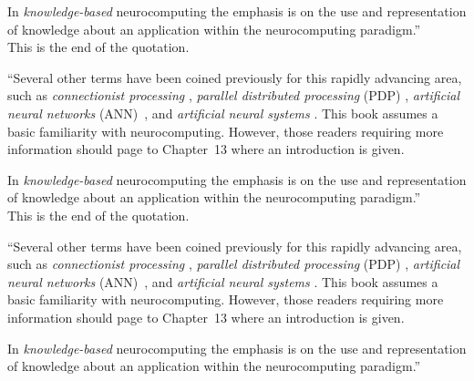 In \emph{knowledge-based}  neurocomputing the emphasis is on the use 
and representation of knowledge about an application within the 
neurocomputing paradigm.''\\

This is the end of the quotation.

``Several other terms have 
been coined previously for this rapidly advancing area, such as 
\emph{connectionist processing} 
\citep{shas95}, 
\emph{parallel distributed processing}
(PDP) \citep{rume86},
\emph{artificial neural networks}
(ANN)~\citep{hass95,roja96},
and 
\emph{artificial neural systems}
\citep{zurada92}.
This book assumes a basic familiarity with neurocomputing. However, 
those readers requiring more information should page to Chapter~13 
where an introduction is given.

In \emph{knowledge-based}  neurocomputing the emphasis is on the use 
and representation of knowledge about an application within the 
neurocomputing paradigm.''\\

This is the end of the quotation.

``Several other terms have 
been coined previously for this rapidly advancing area, such as 
\emph{connectionist processing} 
\citep{shas95}, 
\emph{parallel distributed processing}
(PDP) \citep{rume86},
\emph{artificial neural networks}
(ANN)~\citep{hass95,roja96},
and 
\emph{artificial neural systems}
\citep{zurada92}.
This book assumes a basic familiarity with neurocomputing. However, 
those readers requiring more information should page to Chapter~13 
where an introduction is given.

In \emph{knowledge-based}  neurocomputing the emphasis is on the use 
and representation of knowledge about an application within the 
neurocomputing paradigm.''\\


